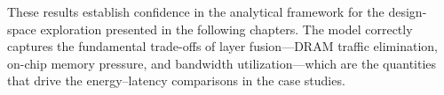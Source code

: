 These results establish confidence in the analytical framework for the
design-space exploration presented in the following chapters.
The model correctly captures the fundamental trade-offs of layer
fusion---DRAM traffic elimination, on-chip memory pressure, and
bandwidth utilization---which are the quantities that drive the
energy--latency comparisons in the case studies.
